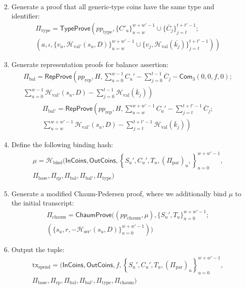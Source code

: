 \documentclass{article}
\newcommand{\func}[1]{\mathsf{#1}}
\newcommand{\com}{\func{Com}}
\newcommand{\hash}{\mathcal{H}}
\begin{document}
\begin{enumerate}
\begin{multline*}
    \end{multline*}
    \item Generate a proof that all generic-type coins have the same type and identifier:
    \begin{multline*}
        \Pi_{\text{type}} = \func{TypeProve}\left( pp_{\text{type}}, \{C'_u\}_{u=w}^{w+w'-1} \cup \{\overline{C}_j\}_{j=t}^{t+t'-1} ; \right. \\
        \left. \left( a, \iota, \{v_u, \hash_{\text{val}'}(s_u, D)\}_{u=w}^{w+w'-1} \cup \{v_j, \hash_{\text{val}}(\overline{k_j})\}_{j=t}^{t+t'-1} \right) \right)
    \end{multline*}
    \item Generate representation proofs for balance assertion:
    \begin{multline*}
    \Pi_{\text{bal}} = \func{RepProve}\left( pp_{\text{rep}}, H, \sum_{u=0}^{w-1} C_u' - \sum_{j=0}^{t-1} \overline{C}_j - \com_3(0,0,f,0); \right. \\
    \left. \sum_{u=0}^{w-1} \hash_{\text{val}'}(s_u,D) - \sum_{j=0}^{t-1} \hash_{\text{val}}(\overline{k}_j) \right)
    \end{multline*}
    \begin{multline*}
    \Pi_{\text{bal}'} = \func{RepProve}\left( pp_{\text{rep}}, H, \sum_{u=w}^{w+w'-1} C_u' - \sum_{j=t}^{t+t'-1} \overline{C}_j ; \right. \\
    \left. \sum_{u=w}^{w+w'-1} \hash_{\text{val}'}(s_u,D) - \sum_{j=t}^{t+t'-1} \hash_{\text{val}}(\overline{k}_j) \right)
    \end{multline*}
    \item Define the following binding hash:
    \begin{multline*}
        \mu = \hash_{\text{bind}}( \func{InCoins}, \func{OutCoins}, \left\{ S_u', C_u', T_u, (\Pi_{\text{par}})_u, \right\}_{u=0}^{w+w'-1}, \\
        \Pi_{\text{base}}, \Pi_{\text{rp}}, \Pi_{\text{bal}}, \Pi_{\text{bal}'}, \Pi_{\text{type}} )
    \end{multline*}
    \item Generate a modified Chaum-Pedersen proof, where we additionally bind $\mu$ to the initial transcript:
    \begin{multline*}
    \Pi_{\text{chaum}} = \func{ChaumProve}((pp_{\text{chaum}}, \mu), \{S_u', T_u\}_{u=0}^{w+w'-1} ; \\
    (\{s_u, r, -\hash_{\text{ser}'}(s_u, D)\}_{u=0}^{w+w'-1}))
    \end{multline*}
    \item Output the tuple:
    \begin{multline*}
    \text{tx}_{\text{spend}} = ( \func{InCoins}, \func{OutCoins}, f, \left\{ S_u', C_u', T_u, (\Pi_{\text{par}})_u \right\}_{u=0}^{w+w'-1}, \\
    \Pi_{\text{base}}, \Pi_{\text{rp}}, \Pi_{\text{bal}}, \Pi_{\text{bal}'}, \Pi_{\text{type}}, \Pi_{\text{chaum}} )
    \end{multline*}
\end{enumerate}
\end{document}
